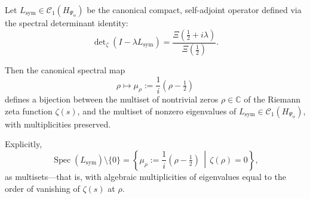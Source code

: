 \begin{lemma}
\label{lem:spectral_bijection_consistency}
Let \( L_{\mathrm{sym}} \in \mathcal{C}_1(H_{\Psi_\alpha}) \) be the canonical compact, self-adjoint operator defined via the spectral determinant identity:
\[
\det\nolimits_\zeta(I - \lambda L_{\mathrm{sym}}) = \frac{\Xi\left(\tfrac{1}{2} + i\lambda\right)}{\Xi\left(\tfrac{1}{2}\right)}.
\]

Then the canonical spectral map
\[
\rho \longmapsto \mu_\rho := \frac{1}{i}(\rho - \tfrac{1}{2})
\]
defines a bijection between the multiset of nontrivial zeros \( \rho \in \mathbb{C} \) of the Riemann zeta function \( \zeta(s) \), and the multiset of nonzero eigenvalues of \( L_{\mathrm{sym}} \in \mathcal{C}_1(H_{\Psi_\alpha}) \), with multiplicities preserved.

\medskip
\noindent
Explicitly,
\[
\operatorname{Spec}(L_{\mathrm{sym}}) \setminus \{0\}
= \left\{ \mu_\rho := \frac{1}{i}(\rho - \tfrac{1}{2}) \,\middle|\, \zeta(\rho) = 0 \right\},
\]
as multisets—that is, with algebraic multiplicities of eigenvalues equal to the order of vanishing of \( \zeta(s) \) at \( \rho \).
\end{lemma}
